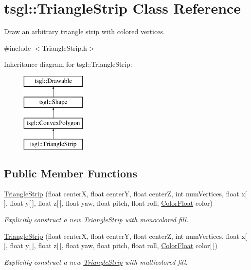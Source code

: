 \hypertarget{classtsgl_1_1_triangle_strip}{}\section{tsgl\+:\+:Triangle\+Strip Class Reference}
\label{classtsgl_1_1_triangle_strip}


Draw an arbitrary triangle strip with colored vertices.  




{\ttfamily \#include $<$Triangle\+Strip.\+h$>$}

Inheritance diagram for tsgl\+:\+:Triangle\+Strip\+:\begin{figure}[H]
\begin{center}
\leavevmode
\includegraphics[height=4.000000cm]{classtsgl_1_1_triangle_strip}
\end{center}
\end{figure}
\subsection*{Public Member Functions}
\begin{DoxyCompactItemize}
\item 
\hyperlink{classtsgl_1_1_triangle_strip_adea2ae457f504be5369f83d0b2852755}{Triangle\+Strip} (float centerX, float centerY, float centerZ, int num\+Vertices, float x\mbox{[}$\,$\mbox{]}, float y\mbox{[}$\,$\mbox{]}, float z\mbox{[}$\,$\mbox{]}, float yaw, float pitch, float roll, \hyperlink{structtsgl_1_1_color_float}{Color\+Float} color)
\begin{DoxyCompactList}\small\item\em Explicitly construct a new \hyperlink{classtsgl_1_1_triangle_strip}{Triangle\+Strip} with monocolored fill. \end{DoxyCompactList}\item 
\hyperlink{classtsgl_1_1_triangle_strip_a253d7c6f3f9bb2fcbba1d9f1b3e2ad8b}{Triangle\+Strip} (float centerX, float centerY, float centerZ, int num\+Vertices, float x\mbox{[}$\,$\mbox{]}, float y\mbox{[}$\,$\mbox{]}, float z\mbox{[}$\,$\mbox{]}, float yaw, float pitch, float roll, \hyperlink{structtsgl_1_1_color_float}{Color\+Float} color\mbox{[}$\,$\mbox{]})
\begin{DoxyCompactList}\small\item\em Explicitly construct a new \hyperlink{classtsgl_1_1_triangle_strip}{Triangle\+Strip} with multicolored fill. \end{DoxyCompactList}\end{DoxyCompactItemize}
